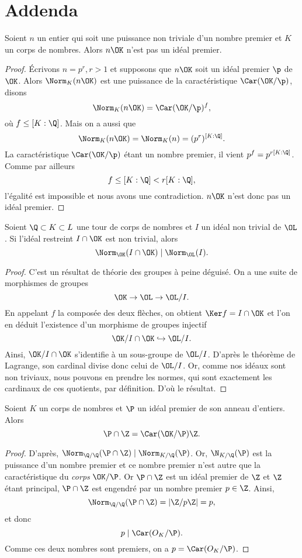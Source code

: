 \documentclass[a4paper, 12pt, oneside]{article}
\begin{document}
\section*{Addenda}

\begin{fait*}
Soient $n$ un entier qui soit une puissance non triviale d'un nombre premier et $ K$ un corps de nombres. Alors $n\OK$ n'est pas un idéal premier.
\end{fait*}

\begin{proof}
Écrivons $n = p^r, r>1$ et supposons que $n\OK$ soit un idéal premier $\p$ de $\OK$. Alors $\Norm_K(n\OK)$ est une puissance de la caractéristique $\Car(\OK/\p)$, disons $$\Norm_K(n\OK) = \Car(\OK/\p)^f,$$ où $f \leq [K : \Q]$. Mais on a aussi que $$\Norm_K(n\OK) = \Norm_K(n) = (p^r)^{[K : \Q]}.$$ La caractéristique $\Car(\OK/\p)$ étant un nombre premier, il vient $p^f = p^{r[K : \Q]}$. Comme par ailleurs $$f \leq [K : \Q] < r[K : \Q],$$ l'égalité est impossible et nous avons une contradiction. $n\OK$ n'est donc pas un idéal premier.
\end{proof}

\begin{fait*}
	Soient $\Q\subset K \subset L$ une tour de corps de nombres et $I$ un idéal non trivial de $\OL$. Si l'idéal restreint $I\cap \OK$ est non trivial, alors $$\Norm_{\OK}(I \cap \OK) \mid \Norm_{\OL}(I).$$
\end{fait*}

\begin{proof}
C'est un résultat de théorie des groupes à peine déguisé. On a une suite de morphismes de groupes $$\OK\to \OL \to \OL/I.$$ En appelant $f$ la composée des deux flèches, on obtient $\Ker f = I\cap \OK$ et l'on en déduit l'existence d'un morphisme de groupes injectif $$\OK/I\cap \OK \hookrightarrow \OL/I.$$ Ainsi, $\OK/ I\cap \OK$ s'identifie à un sous-groupe de $\OL/I$. D'après le théorème de Lagrange, son cardinal divise donc celui de $\OL/I$. Or, comme nos idéaux sont non triviaux, nous pouvons en prendre les normes, qui sont exactement les cardinaux de ces quotients, par définition. D'où le résultat.
\end{proof}

\begin{fait*} Soient $K$ un corps de nombres et $\P$ un idéal premier de son anneau d'entiers. Alors $$\P\cap \Z = \Car(\OK/\P)\Z.$$
\end{fait*}

\begin{proof}
	D'après, $\Norm_{\Q/\Q}(\P\cap\Z)\mid \Norm_{K/\Q}(\P)$. Or, $\N_{K/\Q}(\P)$ est la puissance d'un nombre premier et ce nombre premier n'est autre que la caractéristique du \textit{corps} $\OK/\P$. Or $\P\cap \Z$ est un idéal premier de $\Z$ et $\Z$ étant principal, $\P\cap \Z$ est engendré par un nombre premier $p\in \Z$. Ainsi, $$\Norm_{\Q/\Q}(\P\cap \Z) = |\Z/p\Z| = p,$$ et donc $$p\mid \Car(O_K/\P).$$ Comme ces deux nombres sont premiers, on a $p = \Car(O_K/\P)$.
\end{proof}

\nocite{*}
\printbibliography
\end{document}
